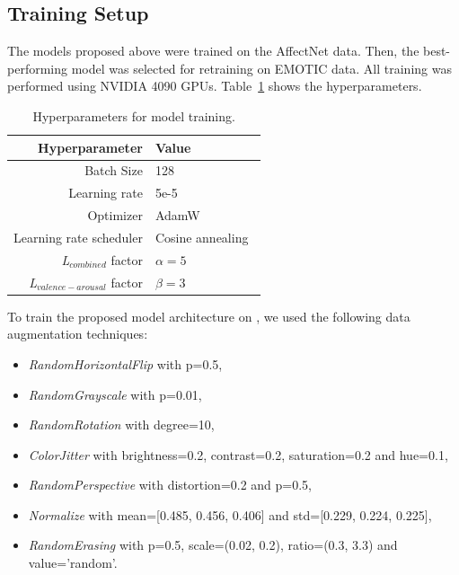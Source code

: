 \subsection{Training Setup}
 
The models proposed above were trained on the AffectNet data. Then, the best-performing model was selected for retraining on EMOTIC data. All training was performed using NVIDIA 4090 GPUs. Table~\ref{tab:hyperparameters} shows the hyperparameters.

\begin{table}[htbp]
\centering
\begin{tabular}{r | l }
\hline
 \textbf{Hyperparameter} & \textbf{Value} \\  \hline
 Batch Size & 128 \\
 Learning rate & 5e-5 \\
  Optimizer & AdamW~\cite{loshchilov2017decoupled} \\
 Learning rate scheduler & Cosine annealing~\cite{loshchilov2016sgdr} \\
\textit{L}$_{combined}$  factor& $\alpha = 5$ \\
\textit{L}$_{valence-arousal}$ factor & $\beta = 3$ \\ \hline
\end{tabular}
\caption{Hyperparameters for model training.}
\label{tab:hyperparameters}
\end{table}

To train the proposed model architecture on \affectnet{}, we used the following data augmentation techniques:
\begin{itemize}
\item \textit{RandomHorizontalFlip} with p=0.5,
\item \textit{RandomGrayscale} with p=0.01,
\item \textit{RandomRotation} with degree=10, 
\item \textit{ColorJitter} with brightness=0.2, contrast=0.2, saturation=0.2 and hue=0.1,
\item \textit{RandomPerspective} with distortion=0.2 and p=0.5,
\item \textit{Normalize} with mean=[0.485, 0.456, 0.406] and std=[0.229, 0.224, 0.225],
\item \textit{RandomErasing} with p=0.5, scale=(0.02, 0.2), ratio=(0.3, 3.3) and value='random'.
\end{itemize}

